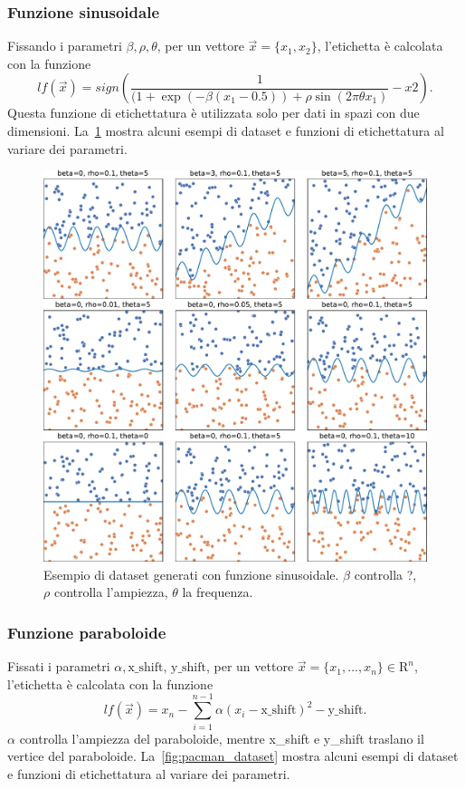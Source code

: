 \subsubsection{Funzione sinusoidale}
Fissando i parametri $\beta,\rho,\theta$, per un vettore $\Vec{x}=\{x_1,x_2\}$, l'etichetta è calcolata con la funzione
$$
lf(\Vec{x}) = sign\left(\frac{1}{(1 + \exp(-\beta(x_1 - 0.5)) + \rho \sin(2\pi\theta x_1)} - x2\right).
$$
Questa funzione di etichettatura è utilizzata solo per dati in spazi con due dimensioni. La~\cref{fig:sinusoid_dataset} mostra alcuni esempi di dataset e funzioni di etichettatura al variare dei parametri.

\begin{figure}[ht]
    \centering
    \includegraphics[width=1\linewidth]{img/sinusoid_dataset_param_influence.pdf}
    \caption{Esempio di dataset generati con funzione sinusoidale. 
    $\beta$ controlla ?, $\rho$ controlla l'ampiezza, $\theta$ la frequenza.}
    \label{fig:sinusoid_dataset}
\end{figure}

\subsubsection{Funzione paraboloide}
Fissati i parametri $\alpha, \text{x\_shift, y\_shift}$, per un vettore $\Vec{x}=\{x_1, \dots, x_n\} \in \mathrm{R}^n$, l'etichetta è calcolata con la funzione
$$
lf(\Vec{x})= x_n - \sum_{i=1}^{n-1}\alpha(x_i - \text{x\_shift})^2 - \text{y\_shift}.
$$
$\alpha$ controlla l'ampiezza del paraboloide, mentre x\_shift e y\_shift traslano il vertice del paraboloide.
La~\cref{fig:pacman_dataset} mostra alcuni esempi di dataset e funzioni di etichettatura al variare dei parametri.

